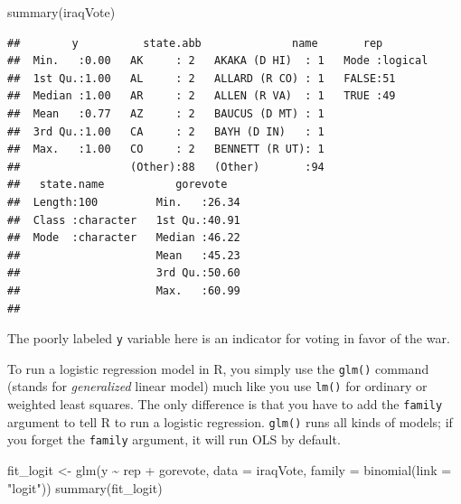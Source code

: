 \documentclass[
  12pt,
  oneside,openany]{book}
\newenvironment{Shaded}{\begin{snugshade}}{\end{snugshade}}
\newcommand{\AttributeTok}[1]{\textcolor[rgb]{0.77,0.63,0.00}{#1}}
\newcommand{\FunctionTok}[1]{\textcolor[rgb]{0.00,0.00,0.00}{#1}}
\newcommand{\NormalTok}[1]{#1}
\newcommand{\OtherTok}[1]{\textcolor[rgb]{0.56,0.35,0.01}{#1}}
\newcommand{\SpecialCharTok}[1]{\textcolor[rgb]{0.00,0.00,0.00}{#1}}
\newcommand{\StringTok}[1]{\textcolor[rgb]{0.31,0.60,0.02}{#1}}
\begin{document}
\begin{Shaded}
\begin{Highlighting}[]
\FunctionTok{summary}\NormalTok{(iraqVote)}
\end{Highlighting}
\end{Shaded}

\begin{verbatim}
##        y          state.abb              name       rep         
##  Min.   :0.00   AK     : 2   AKAKA (D HI)  : 1   Mode :logical  
##  1st Qu.:1.00   AL     : 2   ALLARD (R CO) : 1   FALSE:51       
##  Median :1.00   AR     : 2   ALLEN (R VA)  : 1   TRUE :49       
##  Mean   :0.77   AZ     : 2   BAUCUS (D MT) : 1                  
##  3rd Qu.:1.00   CA     : 2   BAYH (D IN)   : 1                  
##  Max.   :1.00   CO     : 2   BENNETT (R UT): 1                  
##                 (Other):88   (Other)       :94                  
##   state.name           gorevote    
##  Length:100         Min.   :26.34  
##  Class :character   1st Qu.:40.91  
##  Mode  :character   Median :46.22  
##                     Mean   :45.23  
##                     3rd Qu.:50.60  
##                     Max.   :60.99  
## 
\end{verbatim}

The poorly labeled \texttt{y} variable here is an indicator for voting in favor of the war.

To run a logistic regression model in R, you simply use the \texttt{glm()} command (stands for \emph{generalized} linear model) much like you use \texttt{lm()} for ordinary or weighted least squares.
The only difference is that you have to add the \texttt{family} argument to tell R to run a logistic regression.
\texttt{glm()} runs all kinds of models; if you forget the \texttt{family} argument, it will run OLS by default.

\begin{Shaded}
\begin{Highlighting}[]
\NormalTok{fit\_logit }\OtherTok{\textless{}{-}} \FunctionTok{glm}\NormalTok{(y }\SpecialCharTok{\textasciitilde{}}\NormalTok{ rep }\SpecialCharTok{+}\NormalTok{ gorevote,}
                 \AttributeTok{data =}\NormalTok{ iraqVote,}
                 \AttributeTok{family =} \FunctionTok{binomial}\NormalTok{(}\AttributeTok{link =} \StringTok{"logit"}\NormalTok{))}
\FunctionTok{summary}\NormalTok{(fit\_logit)}
\end{Highlighting}
\end{Shaded}
\end{document}
